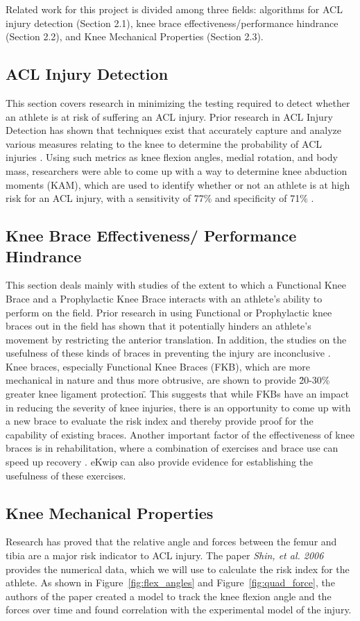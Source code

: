 Related work for this project is divided among three fields: algorithms for ACL injury detection (Section 2.1), knee brace effectiveness/performance hindrance (Section 2.2), and Knee Mechanical Properties (Section 2.3).

\subsection{ACL Injury Detection} This section covers research in minimizing the testing required to detect whether an athlete is at risk of suffering an ACL injury. Prior research in ACL Injury Detection has shown that techniques exist that accurately capture and analyze various measures relating to the knee to determine the probability of ACL injuries \cite{smedicine}. Using such metrics as knee flexion angles, medial rotation, and body mass, researchers were able to come up with a way to determine knee abduction moments (KAM), which are used to identify whether or not an athlete is at high risk for an ACL injury, with a sensitivity of 77\% and specificity of 71\% \cite{smedicine}\cite{Bahr01062005}. 

\subsection{Knee Brace Effectiveness/ Performance Hindrance} This section deals mainly with studies of the extent to which a Functional Knee Brace and a Prophylactic Knee Brace interacts with an athlete's ability to perform on the field. Prior research in using Functional or Prophylactic knee braces out in the field has shown that it potentially hinders an athlete's movement by restricting the anterior translation. In addition, the studies on the usefulness of these kinds of braces in preventing the injury are inconclusive \cite{Myer01042011}. Knee braces, especially Functional Knee Braces (FKB), which are more mechanical in nature and thus more obtrusive, are shown to provide \"20-30\% greater knee ligament protection\". This suggests that while FKBs have an impact in reducing the severity of knee injuries, there is an opportunity to come up with a new brace to evaluate the risk index and thereby provide proof for the capability of existing braces. Another important factor of the effectiveness of knee braces is in rehabilitation, where a combination of exercises and brace use can speed up recovery \cite{hewett2010acl}. eKwip can also provide evidence for establishing the usefulness of these exercises.

\subsection{Knee Mechanical Properties} Research has proved that the relative angle and forces between the femur and tibia are a major risk indicator to ACL injury. The paper \textsl{Shin, et al. 2006} provides the numerical data, which we will use to calculate the risk index for the athlete. As shown in Figure~\ref{fig:flex_angles} and Figure~\ref{fig:quad_force}, the authors of the paper created a model to track the knee flexion angle and the forces over time and found correlation with the experimental model of the injury. \cite{Shin20071145}


